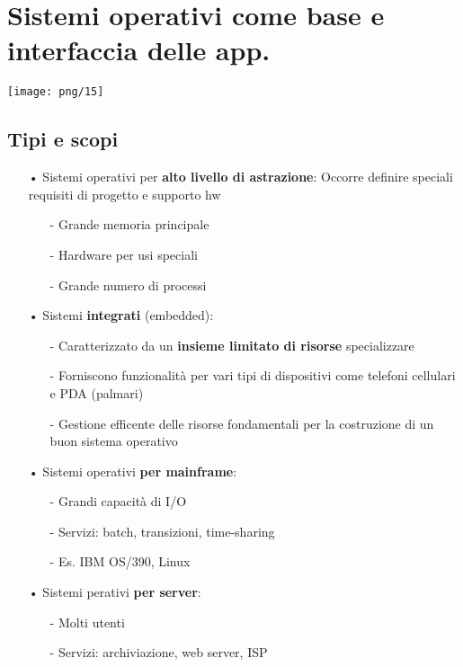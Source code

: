 \documentclass[12pt, letterpaper]{article}
\begin{document}
\section{Sistemi operativi come base e interfaccia delle app.}

\texttt{[image: png/15]}

\newpage

\subsection{Tipi e scopi}

\begin{itemize}
   \item[•] Sistemi operativi per \textbf{alto livello di astrazione}: Occorre definire speciali requisiti di progetto e supporto hw
      \begin{itemize}
         \item[-] Grande memoria principale 
         \item[-] Hardware per usi speciali 
         \item[-] Grande numero di processi 
      \end{itemize}
   \item[•] Sistemi \textbf{integrati} (embedded):
      \begin{itemize}
         \item[-] Caratterizzato da un \textbf{insieme limitato di risorse} specializzare
         \item[-] Forniscono funzionalità per vari tipi di dispositivi come telefoni cellulari e PDA (palmari)
         \item[-] Gestione efficente delle risorse fondamentali per la costruzione di un buon sistema operativo
      \end{itemize}
   \item[•] Sistemi operativi \textbf{per mainframe}:
      \begin{itemize}
         \item[-] Grandi capacità di I/O 
         \item[-] Servizi: batch, transizioni, time-sharing
         \item[-] Es. IBM OS/390, Linux
      \end{itemize}
   \item[•] Sistemi perativi \textbf{per server}:
      \begin{itemize}
         \item[-] Molti utenti
         \item[-] Servizi: archiviazione, web server, ISP

\end{itemize}
\end{itemize}
\end{document}
